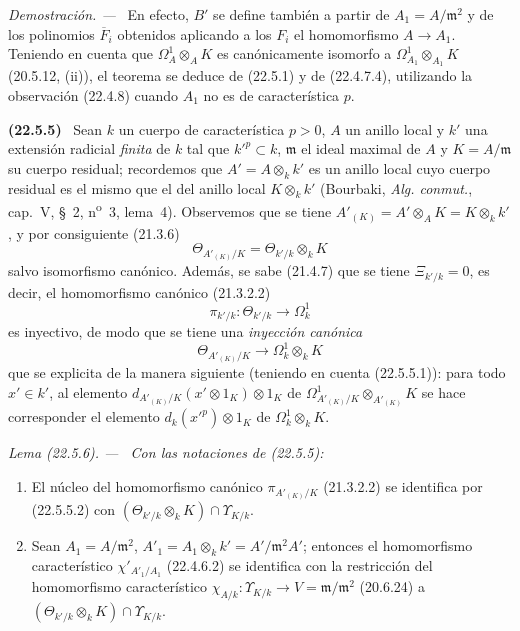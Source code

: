 \documentclass[10pt,oneside]{book}
\makeatletter
\newcommand{\setmanualcurrentlabel}[1]{\def\@currentlabel{#1}}
\newcommand{\oldpage}[2][]{%
  \setcounter{footnote}{0}%
  \marginpar{\scriptsize\textbf{#1}~|~#2}\ignorespaces}
\newenvironment{env}[1][]{\setmanualcurrentlabel{#1}\par\medskip\noindent\textbf{(#1)}\ }{\par}
\newenvironment{lemma}[1][]{%
  \setmanualcurrentlabel{#1}\par\medskip\noindent\itshape Lema (#1). ---\ }{\par}
\newenvironment{proof}{%
  \par\medskip\noindent\textit{Demostración. ---\ }}{\par}
\makeatother
\begin{document}
\begin{proof}
En efecto, $B'$ se define también a partir de $A_1=A/\mathfrak m^2$ y de los
polinomios $\overline F_i$ obtenidos aplicando a los $F_i$ el homomorfismo
$A\longrightarrow A_1$. Teniendo en cuenta que $\Omega^1_A\otimes_AK$ es
canónicamente isomorfo a $\Omega^1_{A_1}\otimes_{A_1}K$ (20.5.12, (ii)), el
teorema se deduce de (22.5.1) y de (22.4.7.4), utilizando la observación
(22.4.8) cuando $A_1$ no es de característica $p$.
\end{proof}

\oldpage[0\textsubscript{IV-1}]{203}

\begin{env}[22.5.5]
\label{0.22.5.5-es}
Sean $k$ un cuerpo de característica $p>0$, $A$ un anillo local y $k'$ una
extensión radicial \emph{finita} de $k$ tal que $k'^p\subset k$,
$\mathfrak m$ el ideal maximal de $A$ y $K=A/\mathfrak m$ su cuerpo residual;
recordemos que $A'=A\otimes_kk'$ es un anillo local cuyo cuerpo residual es
el mismo que el del anillo local $K\otimes_kk'$ (Bourbaki,
\emph{Alg. conmut.}, cap.~V, §~2, n\textsuperscript{o}~3, lema~4). Observemos que
se tiene $A'_{(K)}=A'\otimes_AK=K\otimes_kk'$, y por consiguiente (21.3.6)
\begin{equation}
\label{0.22.5.5.1-es}
  \Theta_{A'_{(K)}/K}=\Theta_{k'/k}\otimes_kK
  \tag{22.5.5.1}
\end{equation}
salvo isomorfismo canónico. Además, se sabe (21.4.7) que se tiene
$\Xi_{k'/k}=0$, es decir, el homomorfismo canónico (21.3.2.2)
\[
  \pi_{k'/k}:\Theta_{k'/k}\longrightarrow\Omega^1_k
\]
es inyectivo, de modo que se tiene una \emph{inyección canónica}
\begin{equation}
\label{0.22.5.5.2-es}
  \Theta_{A'_{(K)}/K}\longrightarrow\Omega^1_k\otimes_kK
  \tag{22.5.5.2}
\end{equation}
que se explicita de la manera siguiente (teniendo en cuenta (22.5.5.1)): para todo
$x'\in k'$, al elemento
$d_{A'_{(K)}/K}(x'\otimes1_K)\otimes1_K$ de
$\Omega^1_{A'_{(K)}/K}\otimes_{A'_{(K)}}K$ se hace corresponder el elemento
$d_k(x'^p)\otimes1_K$ de $\Omega^1_k\otimes_kK$.
\end{env}

\begin{lemma}[22.5.6]
\label{0.22.5.6-es}
Con las notaciones de \textup{(22.5.5)}:
\begin{enumerate}
  \item[\rm(i)] El núcleo del homomorfismo canónico
  $\pi_{A'_{(K)}/K}$ \textup{(21.3.2.2)} se identifica por \textup{(22.5.5.2)} con
  $(\Theta_{k'/k}\otimes_kK)\cap\Upsilon_{K/k}$.
  \item[\rm(ii)] Sean $A_1=A/\mathfrak m^2$,
  $A'_1=A_1\otimes_kk'=A'/\mathfrak m^2A'$; entonces el homomorfismo
  característico $\chi'_{A'_1/A_1}$ \textup{(22.4.6.2)} se identifica con la restricción del
  homomorfismo característico
  $\chi_{A/k}:\Upsilon_{K/k}\longrightarrow V=\mathfrak m/\mathfrak m^2$
  \textup{(20.6.24)} a $(\Theta_{k'/k}\otimes_kK)\cap\Upsilon_{K/k}$.
\end{enumerate}
\end{lemma}
\end{document}
